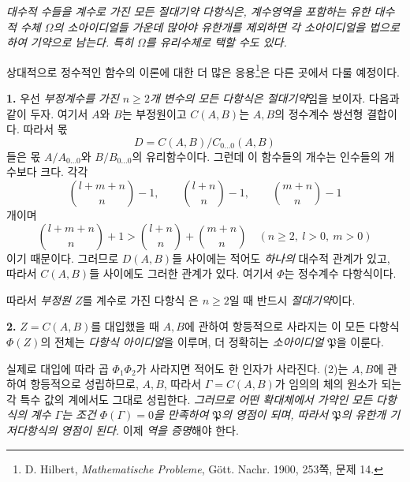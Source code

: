 \emph{대수적 수들을 계수로 가진 모든 절대기약 다항식은, 계수영역을 포함하는 유한 대수적 수체 \(\Omega\)의 소아이디얼들 가운데 많아야 유한개를 제외하면 각 소아이디얼을 법으로 하여 기약으로 남는다. 특히 \(\Omega\)를 유리수체로 택할 수도 있다.}

상대적으로 정수적인 함수의 이론에 대한 더 많은 응용\footnote{D. Hilbert, \emph{Mathematische Probleme}, Gött. Nachr. 1900, 253쪽, 문제 14.}은 다른 곳에서 다룰 예정이다.

\textbf{1.} 우선 \emph{부정계수를 가진 \(n\ge2\)개 변수의 모든 다항식은 절대기약}임을 보이자. 다음과 같이 두자.
여기서 \(A\)와 \(B\)는 부정원이고 \(C(A,B)\)는 \(A,B\)의 정수계수 쌍선형 결합이다. 따라서 몫
\[
D=C(A,B)/C_{0\ldots0}(A,B)
\]
들은 몫 \(A/A_{0\ldots0}\)와 \(B/B_{0\ldots0}\)의 유리함수이다. 그런데 이 함수들의 개수는 인수들의 개수보다 크다. 각각
\[
\binom{l+m+n}{n}-1,\qquad
\binom{l+n}{n}-1,\qquad
\binom{m+n}{n}-1
\]
개이며
\[
\binom{l+m+n}{n}+1>
\binom{l+n}{n}+\binom{m+n}{n}
\quad(n\ge2,\ l>0,\ m>0)
\]
이기 때문이다. 그러므로 \(D(A,B)\)들 사이에는 적어도 \emph{하나의} 대수적 관계가 있고, 따라서 \(C(A,B)\)들 사이에도 그러한 관계가 있다.
여기서 \(\Phi\)는 정수계수 다항식이다.

따라서 \emph{부정원 \(Z\)}를 계수로 가진 다항식
은 \(n\ge2\)일 때 반드시 \emph{절대기약}이다.
\addtocounter{footnote}{1}

\textbf{2.} \(Z=C(A,B)\)를 대입했을 때 \(A,B\)에 관하여 항등적으로 사라지는 이 모든 다항식 \(\Phi(Z)\)의 전체는 \emph{다항식 아이디얼}을 이루며, 더 정확히는 \emph{소아이디얼 \(\mathfrak P\)}을 이룬다.
\addtocounter{footnote}{1}
실제로 대입에 따라 곱 \(\Phi_1\Phi_2\)가 사라지면 적어도 한 인자가 사라진다. (2)는 \(A,B\)에 관하여 항등적으로 성립하므로, \(A,B\), 따라서 \(\Gamma=C(A,B)\)가 임의의 체의 원소가 되는 각 특수 값의 계에서도 그대로 성립한다. \emph{그러므로 어떤 확대체에서 가약인 모든 다항식의 계수 \(\Gamma\)는 조건 \(\Phi(\Gamma)=0\)을 만족하여 \(\mathfrak P\)의 영점이 되며, 따라서 \(\mathfrak P\)의 유한개 기저다항식의 영점이 된다.} 이제 \emph{역을 증명}해야 한다.

